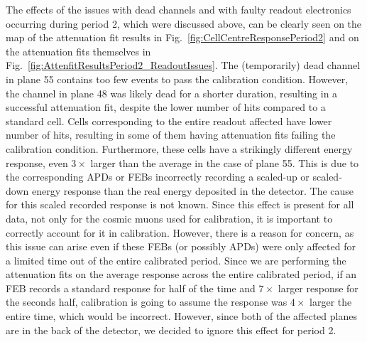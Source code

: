 The effects  of the issues with dead channels and with faulty readout electronics occurring during period 2, which were discussed above, can be clearly seen on the map of the attenuation fit results in Fig.~\ref{fig:CellCentreResponsePeriod2} and on the attenuation fits themselves in Fig.~\ref{fig:AttenfitResultsPeriod2_ReadoutIssues}. The (temporarily) dead channel in plane 55 contains too few events to pass the calibration condition. However, the channel in plane 48 was likely dead for a shorter duration, resulting in a successful attenuation fit, despite the lower number of hits compared to a standard cell. Cells corresponding to the entire readout affected have lower number of hits, resulting in some of them having attenuation fits failing the calibration condition.  Furthermore, these cells have a strikingly different energy response, even $3\times$ larger than the average in the case of plane 55. This is due to the corresponding \glspl{APD} or \glspl{FEB} incorrectly recording a scaled-up or scaled-down energy response than the real energy deposited in the detector. The cause for this scaled recorded response is not known. Since this effect is present for all data, not only for the cosmic muons used for calibration, it is important to correctly account for it in calibration. However, there is a reason for concern, as this issue can arise even if these \glspl{FEB} (or possibly \glspl{APD}) were only affected for a limited time out of the entire calibrated period. Since we are performing the attenuation fits on the average response across the entire calibrated period, if an \gls{FEB} records a standard response for half of the time and $7\times$ larger response for the seconds half, calibration is going to assume the response was $4\times$ larger the entire time, which would be incorrect. However, since both of the affected planes are in the back of the detector, we decided to ignore this effect for period 2.


